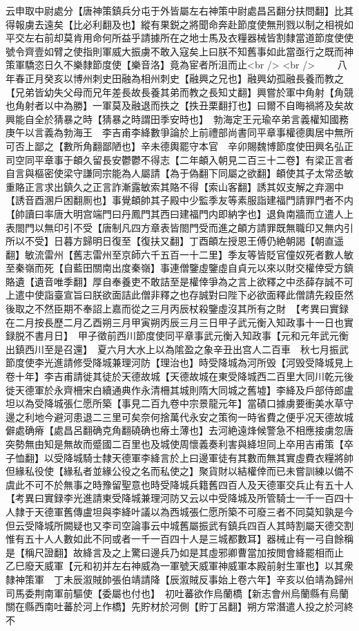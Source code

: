 云申取中尉處分【唐神策鎮兵分屯于外皆屬左右神策中尉處昌呂翻分扶問翻】比其得報虜去遠矣【比必利翻及也】縱有果鋭之將聞命奔赴節度使無刑戮以制之相視如平交左右前却莫肯用命何所益乎請據所在之地士馬及衣糧器械皆割隸當道節度使使號令齊壹如臂之使指則軍威大振虜不敢入寇矣上曰朕不知舊事如此當亟行之既而神策軍驕恣日久不樂隸節度使【樂音洛】竟為宦者所沮而止<br />
<br />
　　八年春正月癸亥以博州刺史田融為相州刺史【融興之兄也】融興幼孤融長養而教之【兄弟皆幼失父母而兄年差長故長養其弟而教之長知丈翻】興嘗於軍中角射【角競也角射者以中為勝】一軍莫及融退而抶之【抶丑栗翻打也】曰爾不自晦禍將及矣故興能自全於猜暴之時【猜暴之時謂田季安時也】　勃海定王元瑜卒弟言義權知國務庚午以言義為勃海王　李吉甫李絳數爭論於上前禮部尚書同平章事權德輿居中無所可否上鄙之【數所角翻鄙陋也】辛未德輿罷守本官　辛卯賜魏博節度使田興名弘正　司空同平章事于頔久留長安鬱鬱不得志【二年頔入朝見二百三十二卷】有梁正言者自言與樞密使梁守謙同宗能為人屬請【為于偽翻下同屬之欲翻】頔使其子太常丞敏重賂正言求出鎮久之正言詐漸露敏索其賂不得【索山客翻】誘其奴支解之弃溷中【誘音酉溷戶困翻厠也】事覺頔帥其子殿中少監季友等素服詣建福門請罪門者不内【帥讀曰率唐大明宫端門曰丹鳳門其西曰建福門内即納字也】退負南牆而立遣人上表閤門以無印引不受【唐制凡四方章表皆閤門受而進之頔方請罪既無職印又無内引所以不受】日暮方歸明日復至【復扶又翻】丁酉頔左授恩王傅仍絶朝謁【朝直遥翻】敏流雷州【舊志雷州至京師六千五百一十二里】季友等皆貶官僮奴死者數人敏至秦嶺而死【自藍田關南出度秦嶺】事連僧鑒虛鑒虛自貞元以來以財交權倖受方鎮賂遺【遺音唯季翻】厚自奉養吏不敢詰至是權倖爭為之言上欲釋之中丞薛存誠不可上遣中使詣臺宣旨曰朕欲面詰此僧非釋之也存誠對曰陛下必欲面釋此僧請先殺臣然後取之不然臣期不奉詔上嘉而從之三月丙辰杖殺鑒虛沒其所有之財　【考異曰實録在二月按長歷二月乙酉朔三月甲寅朔丙辰三月三日甲子武元衡入知政事十一日也實録脱不書月日】　甲子徵前西川節度使同平章事武元衡入知政事【元和元年武元衡出鎮西川至是召還】　夏六月大水上以為隂盈之象辛丑出宫人二百車　秋七月振武節度使李光進請修受降城兼理河防【理治也】時受降城為河所毁【河毁受降城見上卷十年】李吉甫請徙其徒於天德故城【天德故城在東受降城西二百里大同川乾元後徙天德軍於永齊柵宋白續通典作永清柵其城則隋大同城之舊墟】李絳及戶部侍郎盧坦以為受降城張仁愿所築【事見二百九卷中宗景龍元年】當磧口據虜要衝美水草守邊之利地今避河患退二三里可矣奈何捨萬代永安之策徇一時省費之便乎况天德故城僻處确瘠【處昌呂翻确克角翻磽确也瘠土薄也】去河絶遠烽候警急不相應接虜忽唐突勢無由知是無故而蹙國二百里也及城使周懷義奏利害與絳坦同上卒用吉甫策【卒子恤翻】以受降城騎士隸天德軍李絳言於上曰邊軍徒有其數而無其實虛費衣糧將帥但緣私役使【緣私者並緣公役之名而私使之】聚貨財以結權倖而已未嘗訓練以備不虞此不可不於無事之時豫留聖意也時受降城兵籍舊四百人及天德軍交兵止有五十人　【考異曰實録李光進請東受降城兼理河防又云以中受降城及所管騎士一千一百四十人隸于天德軍舊傳盧坦與李絳叶議以為西城張仁愿所築不可廢三者不同莫知孰是今但云受降城所闕疑也又李司空論事云中城舊屬振武有鎮兵四百人其時割屬天德交割惟有五十人人數如此不同或者一千一百四十人是三城都數耳】器械止有一弓自餘稱是【稱尺證翻】故絳言及之上驚曰邊兵乃如是其虛邪卿曹當加按閲會絳罷相而止　乙巳廢天威軍【元和初并左右神威為一軍號天威軍神威軍本殿前射生軍也】以其衆隸神策軍　丁未辰溆賊帥張伯靖請降【辰溆賊反事始上卷六年】辛亥以伯靖為歸州司馬委荆南軍前驅使【委屬也付也】　初吐蕃欲作烏蘭橋【新志會州烏蘭縣有烏蘭關在縣西南吐蕃於河上作橋】先貯材於河側【貯丁呂翻】朔方常潛遣人投之於河終不